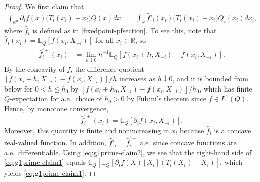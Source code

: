 \documentclass[11pt,reqno]{amsart}
\numberwithin{equation}{section}
\theoremstyle{definition}
\def\E{{\mathbb E}}
\def\R{{\mathbb R}}
\begin{document}
\begin{proof}
	We first claim that
	\begin{align}
		\int_{\R^n}   \partial_i f (x) \big( T_i (x_i) -x_i \big) Q(x) dx &= \int_{\R}  \hat{f}'_i (x_i) \big( T_i (x_i) - x_i \big) Q_i(x_i) dx_i, \label{eq:g1prime-claim1}
	\end{align}
	where $ \hat{f}_i $ is defined as in \eqref{fixedpoint-pfsection}.
	To see this, note that  $ \hat{f}_i(x_i) = \E_{Q}[f(x_i,X_{-i})] $ for all $ x_i \in \R $, so 
	\begin{align*}
	\hat{f}^{\prime +}_i (x_i) &= \lim_{h\downarrow 0} h^{-1}\E_Q[f(x_i+h,X_{-i}) - f(x_i,X_{-i})].
\end{align*}
By the concavity of $f$, the difference quotient $[f(x_i+h,X_{-i}) - f(x_i,X_{-i})]/h$ increases as $h \downarrow 0$,	and it is bounded from below for $0 < h \le h_0$ by $[f(x_i+h_0,X_{-i}) - f(x_i,X_{-i})]/h_0$, which has finite $Q$-expectation for a.e.\ choice of $h_0 > 0$ by Fubini's theorem since $f \in L^1(Q)$. 
	Hence, by monotone convergence,
	\begin{equation}
		\hat{f}^{\prime +}_i (x_i) = \E_Q[ \partial_i f (x_i, X_{-i})].\label{eq:g1prime-claim2}
	\end{equation}
	Moreover, this quantity is finite and nonincreasing in $x_i$ because $\hat{f}_i$ is a concave real-valued function. In addition, $\hat{f}'_i=\hat{f}^{\prime +}_i$ a.e. since concave functions are a.e.\ differentiable.
	Using \eqref{eq:g1prime-claim2}, we see that the right-hand side of \eqref{eq:g1prime-claim1} equals $\E_Q[\E_Q[\partial_i f (X) \,|\, X_i](T_i(X_i)-X_i)]$, which yields \eqref{eq:g1prime-claim1}.


\end{proof}
\end{document}
